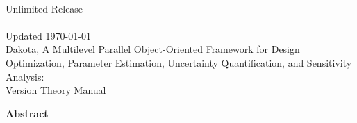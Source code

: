 \documentclass[letterpaper]{book}
\begin{document}
\begin{titlepage}
\setcounter{page}{3}
\begin{center}
{\large \DakotaSANDTheory}\\
{\large Unlimited Release}\\
{\large \DakotaSANDDate}\\
{\large Updated \today}\\

\vspace*{1.5cm}
{\LARGE Dakota, A Multilevel Parallel Object-Oriented Framework for 
Design Optimization, Parameter Estimation, Uncertainty Quantification, 
and Sensitivity Analysis:\\Version \DakotaVersion\space Theory Manual}\\
\vspace*{1cm}

\DakotaAuthorFormatted

\newpage

{\Large \bf Abstract}
\end{center}

\DakotaAbstractShared
\DakotaAbstractTheory

\end{titlepage}

\cleardoublepage
\tableofcontents
\cleardoublepage

%
%








%



\end{document}
